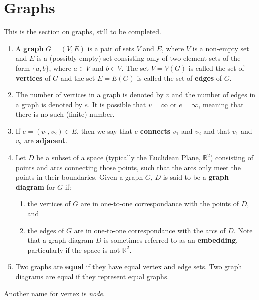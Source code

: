 \section{Graphs}\label{sec:graphs}

This is the section on graphs, still to be completed.

\begin{definition}
\begin{enumerate}
    \item \label{def:graph} A \textbf{graph} $G=(V, E)$ is a pair of sets $V$ and $E$, where $V$ is a non-empty set and $E$ is a (possibly empty) set consisting only of two-element sets of the form $\{a, b\}$, where $a \in V$ and $b \in V$.  The set $V=V(G)$ is called the set of \textbf{vertices} of $G$ and the set $E=E(G)$ is called the set of \textbf{edges} of $G$.
    \item The number of vertices in a graph is denoted by $v$ and the number of edges in a graph is denoted by $e$.  It is possible that $v=\infty$ or $e=\infty$, meaning that there is no such (finite) number.
    \item If $e=(v_1, v_2)\in E$, then we say that $e$ \textbf{connects} $v_1$ and $v_2$ and that $v_1$ and $v_2$ are \textbf{adjacent}.
    \item \label{def:graph_diagram} Let $D$ be a subset of a space (typically the Euclidean Plane, $\mathbb{R}^2$) consisting of points and arcs connecting those points, such that the arcs only meet the points in their boundaries.  Given a graph $G$, $D$ is said to be a \textbf{graph diagram} for $G$ if:
    \begin{enumerate}
        \item the vertices of $G$ are in one-to-one correspondance with the points of $D$, and
        \item the edges of $G$ are in one-to-one correspondance with the arcs of $D$.
    Note that a graph diagram $D$ is sometimes referred to as an \textbf{embedding}, particularly if the space is not $\mathbb{R}^2$.
    \end{enumerate}

    \item Two graphs are \textbf{equal} if they have equal vertex and edge sets.  Two graph diagrams are equal if they represent equal graphs.
\end{enumerate}
\end{definition}

Another name for vertex is \textit{node}.


